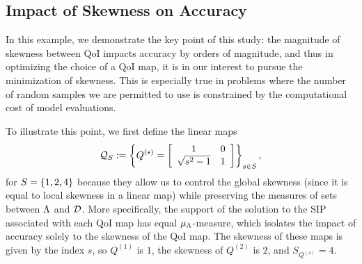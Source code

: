 \subsection{Impact of Skewness on Accuracy}\label{ex:skewness}
In this example, we demonstrate the key point of this study: the magnitude of skewness between QoI impacts accuracy by orders of magnitude, and thus in optimizing the choice of a QoI map, it is in our interest to pursue the minimization of skewness.
This is especially true in problems where the number of random samples we are permitted to use is constrained by the computational cost of model evaluations.


To illustrate this point, we first define the linear maps
\begin{equation}\label{eq:qmap2}
\qspace_S := \left \lbrace Q^{(s)} =  \mat{cc}{1 & 0 \\ \sqrt{s^2 - 1}& 1 } \right \rbrace_{s\in S},
\end{equation}
for $S=\set{1,2,4}$ because they allow us to control the global skewness (since it is equal to local skewness in a linear map) while preserving the measures of sets between $\pspace$ and $\dspace$.
More specifically, the support of the solution to the SIP associated with each QoI map has equal $\mu_\pspace$-measure, which isolates the impact of accuracy solely to the skewness of the QoI map.
The skewness of these maps is given by the index $s$, so $Q^{(1)}$ is $1$, the skewness of $Q^{(2)}$ is $2$, and $S_{Q^{(4)}} = 4$.


